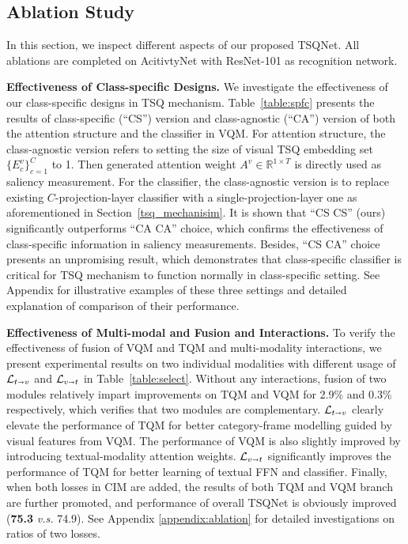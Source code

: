 \documentclass[runningheads]{llncs}
\newcommand{\tabref}[1]{Table~\ref{#1}}
\newcommand{\secref}[1]{Section~\ref{#1}}
\begin{document}
\subsection{Ablation Study}
\label{exp:ablation}


In this section, we inspect different aspects of our proposed TSQNet. All ablations are completed on AcitivtyNet with ResNet-101 as recognition network. 


\noindent \textbf{Effectiveness of Class-specific Designs.}
We investigate the effectiveness of our class-specific designs in TSQ mechanism. 
\tabref{table:spfc} presents the results of class-specific (``CS'') version and class-agnostic (``CA'') version of both the attention structure and the classifier in VQM. 
For attention structure, the class-agnostic version refers to setting the size of visual TSQ embedding set $\{E_{c}^v\}_{c=1}^C$ to 1. Then generated attention weight $A^v\in \mathbb{R}^{1\times T}$ is directly used as saliency measurement. For the classifier, the class-agnostic version is to replace existing $C$-projection-layer classifier with a single-projection-layer one as aforementioned in \secref{tsq_mechanisim}. 
It is shown that ``CS CS'' (ours) significantly outperforms ``CA CA'' choice, which confirms the effectiveness of class-specific information in saliency measurements. Besides, ``CS CA'' choice presents an unpromising result, which demonstrates that class-specific classifier is critical for TSQ mechanism to function normally in class-specific setting. See Appendix for illustrative examples of these three settings and detailed explanation of comparison of their performance.


\noindent\textbf{Effectiveness of Multi-modal and Fusion and Interactions.}
To verify the effectiveness of fusion of VQM and TQM and multi-modality interactions, we present experimental results on two individual modalities with different usage of $\mathcal{L}_{t \shortrightarrow v}$ and $\mathcal{L}_{v \shortrightarrow t}$ in \tabref{table:select}. 
Without any interactions, fusion of two modules relatively impart improvements on TQM and VQM for 2.9\% and 0.3\% respectively, which verifies that two modules are complementary. $\mathcal{L}_{t \shortrightarrow v}$ clearly elevate the performance of TQM for better category-frame modelling guided by visual features from VQM. The performance of VQM is also slightly improved by introducing textual-modality attention weights. $\mathcal{L}_{v \shortrightarrow t}$ significantly improves the performance of TQM for better learning of textual FFN and classifier.
Finally, when both losses in CIM are added, the results of both TQM and VQM branch are further promoted, and performance of overall TSQNet is obviously improved (\textbf{75.3} \emph{v.s.} 74.9). See Appendix \ref{appendix:ablation} for detailed investigations on ratios of two losses. 
\end{document}
